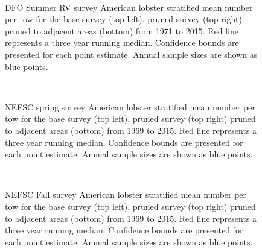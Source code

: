 \documentclass[11pt]{article}
\newcommand{\e}{/backup/bio_data/bio.lobster/figures/} %
\begin{document}
\begin{figure}
\centering
{}
\\

\caption{DFO Summer RV survey American lobster stratified mean number per tow for the base survey (top left), pruned survey (top right) pruned to adjacent areas (bottom) from 1971 to 2015. Red line represents a three year running median. Confidence bounds are presented for each point estimate. Annual sample sizes are shown as blue points. }
\end{figure}
\clearpage

\begin{figure}
\centering
{}
\\

\caption{NEFSC spring survey American lobster stratified mean number per tow for the base survey (top left), pruned survey (top right) pruned to adjacent areas (bottom) from 1969 to 2015. Red line represents a three year running median. Confidence bounds are presented for each point estimate. Annual sample sizes are shown as blue points. }
\end{figure}
\clearpage


\begin{figure}
\centering
{}
\\

\caption{NEFSC Fall survey American lobster stratified mean number per tow for the base survey (top left), pruned survey (top right) pruned to adjacent areas (bottom) from 1969 to 2015. Red line represents a three year running median. Confidence bounds are presented for each point estimate. Annual sample sizes are shown as blue points. }
\end{figure}
\clearpage
\end{document}
